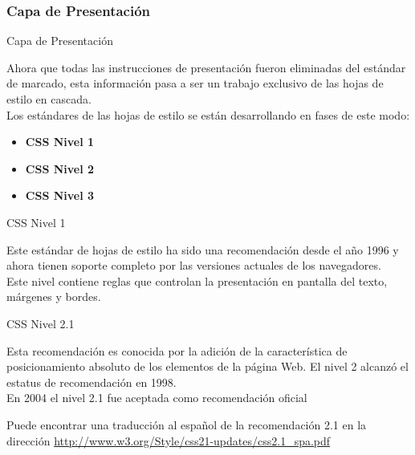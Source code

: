 \documentclass{beamer}
\begin{document}
\subsubsection{Capa de Presentación} 

\begin{frame}{Capa de Presentación} %
    \begin{center}
        Ahora que todas las instrucciones de presentación fueron eliminadas del
        estándar de marcado,  esta información pasa a ser un trabajo exclusivo
        de las hojas de estilo en cascada.\\[0.5cm]

        Los estándares de las hojas de estilo se están desarrollando en fases
        de este modo: 

        \begin{itemize}
            \item \textbf{CSS Nivel 1}
            \item \textbf{CSS Nivel 2}
            \item \textbf{CSS Nivel 3}
        \end{itemize}

   
    \end{center}
\end{frame}

\begin{frame}{CSS Nivel 1} %
    \begin{center}
        Este estándar de hojas de estilo ha sido una recomendación desde el año
        1996 y ahora tienen soporte completo por las versiones actuales de los
        navegadores. \\[0.5cm]

        Este nivel contiene reglas que controlan la presentación en pantalla
        del texto, márgenes y bordes. 
    \end{center}
\end{frame}

\begin{frame}{CSS Nivel 2.1} %
    \begin{center}
    Esta recomendación es conocida por la adición de la característica de
    posicionamiento absoluto de los elementos de la página Web. El nivel 2
    alcanzó el estatus de recomendación en 1998. \\[0.5cm]

    En 2004 el nivel 2.1 fue aceptada como recomendación oficial 

    Puede encontrar una traducción al español de la recomendación 2.1 en la
    dirección \url{http://www.w3.org/Style/css21-updates/css2.1_spa.pdf}
    \end{center}
\end{frame}
\end{document}
